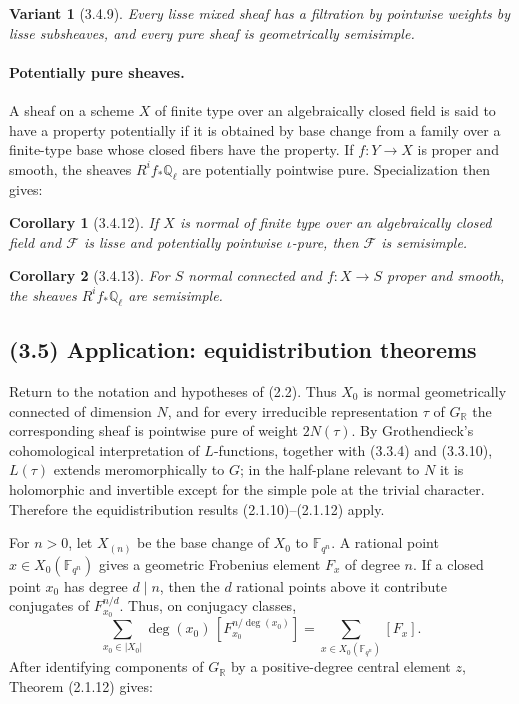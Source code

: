 \documentclass[11pt]{article}
\newtheorem{corollary}{Corollary}
\newtheorem{variant}{Variant}
\theoremstyle{remark}
\newcommand{\Ql}{\mathbb{Q}_\ell}
\newcommand{\RR}{\mathbb{R}}
\begin{document}
\begin{variant}[3.4.9]
Every lisse mixed sheaf has a filtration by pointwise weights by lisse subsheaves, and every pure sheaf is geometrically semisimple.
\end{variant}

\paragraph{Potentially pure sheaves.}
A sheaf on a scheme $X$ of finite type over an algebraically closed field is said to have a property potentially if it is obtained by base change from a family over a finite-type base whose closed fibers have the property. If $f:Y\to X$ is proper and smooth, the sheaves $R^if_{*}\Ql$ are potentially pointwise pure. Specialization then gives:

\begin{corollary}[3.4.12]
If $X$ is normal of finite type over an algebraically closed field and $\mathcal F$ is lisse and potentially pointwise $\iota$-pure, then $\mathcal F$ is semisimple.
\end{corollary}

\begin{corollary}[3.4.13]
For $S$ normal connected and $f:X\to S$ proper and smooth, the sheaves $R^if_{*}\Ql$ are semisimple.
\end{corollary}

\subsection*{(3.5) Application: equidistribution theorems}

Return to the notation and hypotheses of (2.2). Thus $X_0$ is normal geometrically connected of dimension $N$, and for every irreducible representation $\tau$ of $G_\RR$ the corresponding sheaf is pointwise pure of weight $2N(\tau)$. By Grothendieck's cohomological interpretation of $L$-functions, together with (3.3.4) and (3.3.10), $L(\tau)$ extends meromorphically to $G$; in the half-plane relevant to $N$ it is holomorphic and invertible except for the simple pole at the trivial character. Therefore the equidistribution results (2.1.10)--(2.1.12) apply.

For $n>0$, let $X_{(n)}$ be the base change of $X_0$ to $\mathbb{F}_{q^n}$. A rational point $x\in X_0(\mathbb{F}_{q^n})$ gives a geometric Frobenius element $F_x$ of degree $n$. If a closed point $x_0$ has degree $d\mid n$, then the $d$ rational points above it contribute conjugates of $F_{x_0}^{n/d}$. Thus, on conjugacy classes,
\begin{equation}\tag{3.5.2.1}
\sum_{x_0\in |X_0|}\deg(x_0)\,[F_{x_0}^{n/\deg(x_0)}]
=\sum_{x\in X_0(\mathbb{F}_{q^n})}[F_x] .
\end{equation}
After identifying components of $G_\RR$ by a positive-degree central element $z$, Theorem (2.1.12) gives:
\end{document}
